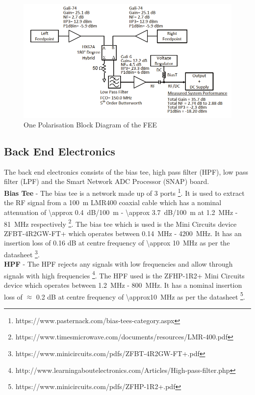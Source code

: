 \documentclass[12pt,a4paper]{report}
\begin{document}
	\begin{figure}[h!]
		\begin{center}
			\includegraphics[width=0.7\linewidth]{Figures/Balun_Block.png}
			\caption{One Polarisation Block Diagram of the FEE \cite{2012PASP..124.1090H}}
			\label{Fig:Balun Schematic}
		\end{center}
	\end{figure}
	
	\newpage
	\subsection{Back End Electronics}	
	The back end electronics consists of the bias tee, high pass filter (HPF), low pass filter (LPF) and the Smart Network ADC Processor (SNAP) board. \\

	\textbf{Bias Tee} - The bias tee is a network made up of 3 ports \footnote{https://www.pasternack.com/bias-tees-category.aspx}. It is used to extract the RF signal from a \SI{100}{m} LMR400 coaxial cable which has a nominal attenuation of \SI{\approx 0.4}{dB/\SI{100}{m}} - \SI{\approx 3.7}{dB/\SI{100}{m}} at \SI{1.2}{MHz} - \SI{81}{MHz} respectively \footnote{https://www.timesmicrowave.com/documents/resources/LMR-400.pdf}. The bias tee which is used is the Mini Circuits device ZFBT-4R2GW-FT+ which operates between \SI{0.14}{MHz} - \SI{4200}{MHz}. It has an insertion loss of 0.16 dB at centre frequency of  \SI{\approx 10}{MHz} as per the datasheet \footnote{https://www.minicircuits.com/pdfs/ZFBT-4R2GW-FT+.pdf}.\\
	
	\textbf{HPF} - The HPF rejects any signals with low frequencies and allow through signals with high frequencies \footnote{http://www.learningaboutelectronics.com/Articles/High-pass-filter.php}. The HPF used is the ZFHP-1R2+ Mini Circuits device which operates between  \SI{1.2}{MHz} - \SI{800}{MHz}. It has a nominal insertion loss of $\approx$ 0.2 dB at centre frequency of  \SI{\approx10}{MHz} as per the datasheet \footnote{https://www.minicircuits.com/pdfs/ZFHP-1R2+.pdf}.\\
	
\end{document}
